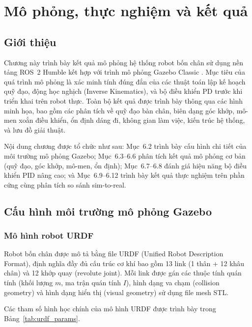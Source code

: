 \chapter{Mô phỏng, thực nghiệm và kết quả}
%

\section{Giới thiệu}
Chương này trình bày kết quả mô phỏng hệ thống robot bốn chân sử dụng nền tảng ROS~2 Humble \cite{ros2docs} kết hợp với trình mô phỏng Gazebo Classic \cite{gazebo}. Mục tiêu của quá trình mô phỏng là xác minh tính đúng đắn của các thuật toán lập kế hoạch quỹ đạo, động học nghịch (Inverse Kinematics), và bộ điều khiển PD trước khi triển khai trên robot thực. Toàn bộ kết quả được trình bày thông qua các hình minh họa, bao gồm các phân tích về quỹ đạo bàn chân, biên dạng góc khớp, mô-men xoắn điều khiển, ổn định dáng đi, không gian làm việc, kiến trúc hệ thống, và lưu đồ giải thuật.

Nội dung chương được tổ chức như sau: Mục~6.2 trình bày cấu hình chi tiết của môi trường mô phỏng Gazebo; Mục~6.3--6.6 phân tích kết quả mô phỏng cơ bản (quỹ đạo, góc khớp, mô-men, ổn định); Mục~6.7--6.8 đánh giá hiệu năng bộ điều khiển PID nâng cao; và Mục~6.9--6.12 trình bày kết quả thực nghiệm trên phần cứng cùng phân tích so sánh sim-to-real.

\section{Cấu hình môi trường mô phỏng Gazebo}

\subsection{Mô hình robot URDF}

Robot bốn chân được mô tả bằng file URDF (Unified Robot Description Format), định nghĩa đầy đủ cấu trúc cơ khí bao gồm 13 link (1 thân + 12 khâu chân) và 12 khớp quay (revolute joint). Mỗi link được gán các thuộc tính quán tính (khối lượng $m$, ma trận quán tính $I$), hình dạng va chạm (collision geometry) và hình dạng hiển thị (visual geometry) sử dụng file mesh STL.

Các tham số hình học chính của mô hình URDF được trình bày trong Bảng~\ref{tab:urdf_params}.

